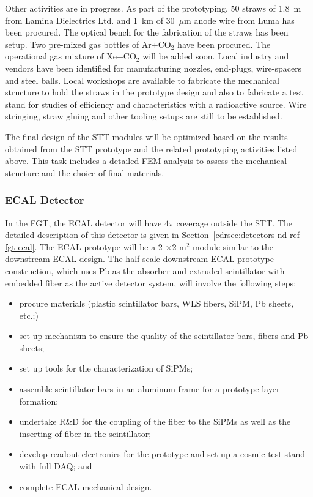 Other activities are in progress. As part of the prototyping, 50 straws of 1.8~m from Lamina
Dielectrics Ltd. and 1~km of 30~$\mu$m anode wire from Luma
has been procured. The optical bench for the fabrication of the
straws has been setup.  Two pre-mixed gas bottles of Ar+CO$_2$ have been
procured. The operational gas mixture of
Xe+CO$_2$ will be added
soon. Local industry and vendors have been identified for
manufacturing nozzles, end-plugs, wire-spacers and steel
balls. Local workshops are available to fabricate the mechanical
structure to hold the straws in the prototype design and also to
fabricate a test stand for studies of efficiency and characteristics with
a radioactive source. Wire stringing, straw gluing and other tooling
setups are still to be established.


The final design of the STT modules will be optimized based on the
results obtained from the STT prototype and the related prototyping
activities listed above. This task includes a detailed FEM analysis to
assess the mechanical structure and the choice of final
materials. 



\subsubsection{ECAL Detector}

In the FGT, the ECAL detector will have $4\pi$ coverage outside
the STT.  The detailed description of this
detector is given in Section~\ref{cdrsec:detectors-nd-ref-fgt-ecal}.
The ECAL prototype will be a 2 $\times$2-m$^2$ module similar to the
downstream-ECAL design.  The half-scale downstream ECAL prototype
construction, which uses Pb as the absorber and extruded scintillator
with embedded fiber as the active detector system, will involve the
following steps:
\begin{itemize}
\item procure materials (plastic scintillator bars, WLS fibers,
  SiPM, Pb sheets, etc.;)
\item set up mechanism to ensure the quality of the scintillator bars,
  fibers and Pb sheets;
\item set up tools for the characterization of SiPMs;
\item assemble scintillator bars in an aluminum frame for a
  prototype layer formation;
\item undertake R\&D for the coupling of the fiber to the SiPMs as well
  as the inserting of fiber in the scintillator;
\item develop readout electronics for the prototype and set up a cosmic
  test stand with full DAQ; and
\item complete ECAL mechanical design. 
\end{itemize}

